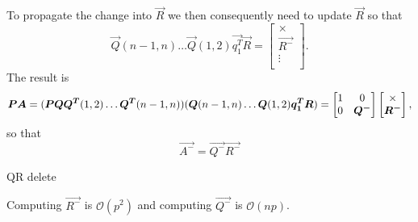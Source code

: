 To propagate the change into $\vec{R}$ we then consequently need to update $\vec{R}$ so that
\begin{equation}
    \vec{Q}(n-1,n) \ldots \vec{Q}(1,2)\vec{q_1^T} \vec{R} =     \begin{bmatrix}
        \times \\
        \vec{R^{-}}\\
        \vdots \\
    \end{bmatrix}.
\end{equation}
The result is
\begin{equation}
    \vec{P}\vec{A} = (\vec{P}\vec{Q}  \vec{Q^T}(1,2) \ldots   \vec{Q^T}(n-1,n)) (\vec{Q}(n-1,n) \ldots \vec{Q}(1,2)\vec{q_1^T} \vec{R} ) \\
    = 
    \begin{bmatrix}
        1 & 0 \\
        0 & \vec{Q^{-}}
    \end{bmatrix}
    \begin{bmatrix}
        \times \\
        \vec{R^{-}}
    \end{bmatrix},
\end{equation}
so that 
\begin{equation}
    \vec{A^{-}} = \vec{Q^{-}}\vec{R^{-}}
\end{equation}

\begin{algorithm}[H]
    \label{removingrow}
      \caption{QR delete}

    \;
\end{algorithm}

Computing $\vec{R^{-}}$ is $\mathcal{O}(p^2)$ and computing $\vec{Q^{-}}$ is $\mathcal{O}(np)$.





